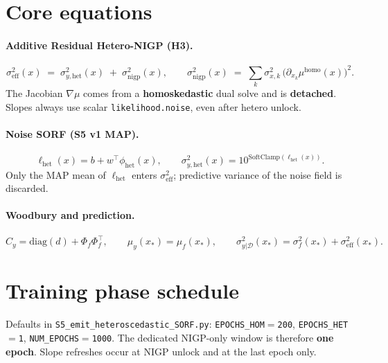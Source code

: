\documentclass[11pt]{article}
\newcommand{\sighet}{\sigma_{y,\mathrm{het}}^{2}}
\newcommand{\signigp}{\sigma_{\mathrm{nigp}}^{2}}
\newcommand{\sigeff}{\sigma_{\mathrm{eff}}^{2}}
\newcommand{\sigobs}{\sigma_{y|\mathcal{D}}^{2}}
\newcommand{\Phif}{\Phi_{f}}
\newcommand{\Cy}{C_{y}}
\begin{document}
\FloatBarrier
\section{Core equations}
\label{sec:eq}

\paragraph{Additive Residual Hetero-NIGP (H3).}
\begin{equation}
  \sigeff(x)
  \;=\;
  \sighet(x)
  \;+\;
  \signigp(x),
  \qquad
  \signigp(x)
  \;=\;
  \sum_{k}\sigma_{x,k}^{2}\,
  \bigl(\partial_{x_k}\mu^{\mathrm{homo}}(x)\bigr)^{2}.
\end{equation}
The Jacobian $\nabla\mu$ comes from a \textbf{homoskedastic} dual solve and is
\textbf{detached}.
Slopes always use scalar \texttt{likelihood.noise}, even after hetero unlock.

\paragraph{Noise SORF (S5 v1 MAP).}
\begin{equation}
  \ell_{\mathrm{het}}(x)=b+w^{\top}\phi_{\mathrm{het}}(x),
  \qquad
  \sighet(x)=10^{\mathrm{SoftClamp}(\ell_{\mathrm{het}}(x))}.
\end{equation}
Only the MAP mean of $\ell_{\mathrm{het}}$ enters $\sigeff$; predictive variance
of the noise field is discarded.

\paragraph{Woodbury and prediction.}
\begin{equation}
  \Cy=\mathrm{diag}(d)+\Phif\Phif^{\top},
  \qquad
  \mu_{y}(x_{*})=\mu_{f}(x_{*}),
  \qquad
  \sigobs(x_{*})=\sigma_{f}^{2}(x_{*})+\sigeff(x_{*}).
\end{equation}

\FloatBarrier
\section{Training phase schedule}
\label{sec:schedule}

Defaults in \texttt{S5\_emit\_heteroscedastic\_SORF.py}:
\texttt{EPOCHS\_HOM$=$200}, \texttt{EPOCHS\_HET$=$1}, \texttt{NUM\_EPOCHS$=$1000}.
The dedicated NIGP-only window is therefore \textbf{one epoch}.
Slope refreshes occur at NIGP unlock and at the last epoch only.
\end{document}
